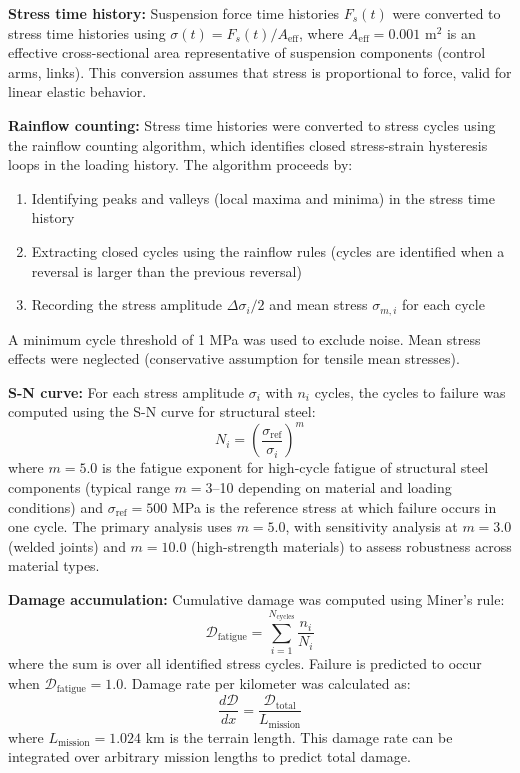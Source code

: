 \documentclass[11pt,letterpaper]{article}
\begin{document}
\textbf{Stress time history:} Suspension force time histories $F_s(t)$ were converted to stress time histories using $\sigma(t) = F_s(t)/A_{\text{eff}}$, where $A_{\text{eff}} = 0.001$ m$^2$ is an effective cross-sectional area representative of suspension components (control arms, links). This conversion assumes that stress is proportional to force, valid for linear elastic behavior.

\textbf{Rainflow counting:} Stress time histories were converted to stress cycles using the rainflow counting algorithm\cite{ASTM_E1049}, which identifies closed stress-strain hysteresis loops in the loading history. The algorithm proceeds by:
\begin{enumerate}
\item Identifying peaks and valleys (local maxima and minima) in the stress time history
\item Extracting closed cycles using the rainflow rules (cycles are identified when a reversal is larger than the previous reversal)
\item Recording the stress amplitude $\Delta\sigma_i/2$ and mean stress $\sigma_{m,i}$ for each cycle
\end{enumerate}
A minimum cycle threshold of 1 MPa was used to exclude noise. Mean stress effects were neglected (conservative assumption for tensile mean stresses).

\textbf{S-N curve:} For each stress amplitude $\sigma_i$ with $n_i$ cycles, the cycles to failure was computed using the S-N curve for structural steel:
\begin{equation}
N_i = \left(\frac{\sigma_{\text{ref}}}{\sigma_i}\right)^m
\end{equation}
where $m = 5.0$ is the fatigue exponent for high-cycle fatigue of structural steel components (typical range $m = 3$--10 depending on material and loading conditions) and $\sigma_{\text{ref}} = 500$ MPa is the reference stress at which failure occurs in one cycle. The primary analysis uses $m = 5.0$, with sensitivity analysis at $m = 3.0$ (welded joints) and $m = 10.0$ (high-strength materials) to assess robustness across material types.

\textbf{Damage accumulation:} Cumulative damage was computed using Miner's rule:
\begin{equation}
\mathcal{D}_{\text{fatigue}} = \sum_{i=1}^{N_{\text{cycles}}} \frac{n_i}{N_i}
\end{equation}
where the sum is over all identified stress cycles. Failure is predicted to occur when $\mathcal{D}_{\text{fatigue}} = 1.0$. Damage rate per kilometer was calculated as:
\begin{equation}
\frac{d\mathcal{D}}{dx} = \frac{\mathcal{D}_{\text{total}}}{L_{\text{mission}}}
\end{equation}
where $L_{\text{mission}} = 1.024$ km is the terrain length. This damage rate can be integrated over arbitrary mission lengths to predict total damage.
\end{document}
